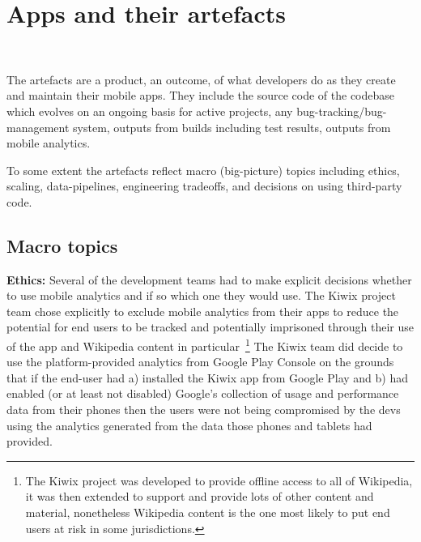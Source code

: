 \chapter{Apps and their artefacts}~\label{chapter-apps-and-their-artefacts}

The artefacts are a product, an outcome, of what developers do as they create and maintain their mobile apps. They include the source code of the codebase which evolves on an ongoing basis for active projects, any bug-tracking/bug-management system, outputs from builds including test results, outputs from mobile analytics. 

To some extent the artefacts reflect macro (big-picture) topics including ethics, scaling, data-pipelines, engineering tradeoffs, and decisions on using third-party code.


\section{Macro topics}

\textbf{Ethics:} Several of the development teams had to make explicit decisions whether to use mobile analytics and if so which one they would use. The Kiwix project team chose explicitly to exclude mobile analytics from their apps to reduce the potential for end users to be tracked and potentially imprisoned through their use of the app and Wikipedia content in particular~\footnote{The Kiwix project was developed to provide offline access to all of Wikipedia, it was then extended to support and provide lots of other content and material, nonetheless Wikipedia content is the one most likely to put end users at risk in some jurisdictions.} The Kiwix team did decide to use the platform-provided analytics from Google Play Console on the grounds that if the end-user had a) installed the Kiwix app from Google Play and b) had enabled (or at least not disabled) Google's collection of usage and performance data from their phones then the users were not being compromised by the devs using the analytics generated from the data those phones and tablets had provided.

